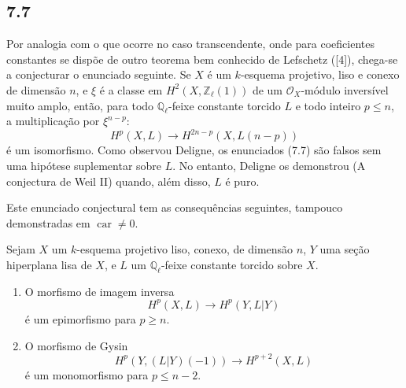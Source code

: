 \subsection*{7.7}

Por analogia com o que ocorre no caso transcendente, onde para coeficientes constantes se dispõe de outro teorema bem conhecido de Lefschetz ([4]), chega-se a conjecturar o enunciado seguinte. Se $X$ é um $k$-esquema projetivo, liso e conexo de dimensão $n$, e $\xi$ é a classe em $H^2(X,\mathbb Z_\ell(1))$ de um $\mathcal O_X$-módulo inversível muito amplo, então, para todo $\mathbb Q_\ell$-feixe constante torcido $L$ e todo inteiro $p\le n$, a multiplicação por $\xi^{n-p}$:
\[
H^p(X,L)\to H^{2n-p}(X,L(n-p))
\]
é um isomorfismo. Como observou Deligne, os enunciados (7.7) são falsos sem uma hipótese suplementar sobre $L$. No entanto, Deligne os demonstrou (A conjectura de Weil II) quando, além disso, $L$ é puro.

Este enunciado conjectural tem as consequências seguintes, tampouco demonstradas em $\operatorname{car}\ne0$.

Sejam $X$ um $k$-esquema projetivo liso, conexo, de dimensão $n$, $Y$ uma seção hiperplana lisa de $X$, e $L$ um $\mathbb Q_\ell$-feixe constante torcido sobre $X$.
\begin{enumerate}[label=(\roman*)]
\item O morfismo de imagem inversa
\[
H^p(X,L)\to H^p(Y,L|Y)
\]
é um epimorfismo para $p\ge n$.
\item O morfismo de Gysin
\[
H^p(Y,(L|Y)(-1))\to H^{p+2}(X,L)
\]
é um monomorfismo para $p\le n-2$.
\end{enumerate}
